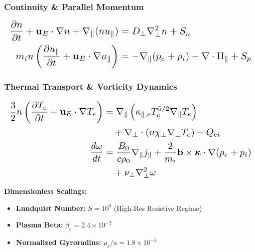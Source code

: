 \documentclass[landscape,a0,final]{a0poster}
\newlength{\colwidth}
\begin{document}
\begin{minipage}[t]{\colwidth}
\begin{tcolorbox}[posterbox, title={\faAtom\ 2. 5-Field Gyrofluid Transport Model}]
    \subsubsection*{Continuity \& Parallel Momentum}
    \[\resizebox{\linewidth}{!}{$\displaystyle
      \begin{aligned}
        \frac{\partial n}{\partial t} + \mathbf{u}_E \cdot \nabla n + \nabla_\parallel (n u_\parallel) &= D_\perp \nabla_\perp^2 n + S_n \\
        m_i n \left( \frac{\partial u_\parallel}{\partial t} + \mathbf{u}_E \cdot \nabla u_\parallel \right) &= -\nabla_\parallel (p_e + p_i) - \nabla \cdot \Pi_\parallel + S_p
      \end{aligned}
    $}\]

    \subsubsection*{Thermal Transport \& Vorticity Dynamics}
    \[\resizebox{\linewidth}{!}{$\displaystyle
      \begin{aligned}
        \frac{3}{2} n \left( \frac{\partial T_e}{\partial t} + \mathbf{u}_E \cdot \nabla T_e \right) &= \nabla_\parallel \left( \kappa_{\parallel,e} T_e^{5/2} \nabla_\parallel T_e \right) \\
        &\quad + \nabla_\perp \cdot (n \chi_\perp \nabla_\perp T_e) - Q_{ei} \\
        \frac{d \omega}{d t} &= \frac{B_0}{c \rho_0} \nabla_\parallel j_\parallel + \frac{2}{m_i} \mathbf{b} \times \boldsymbol{\kappa} \cdot \nabla (p_e + p_i) \\
        &\quad + \nu_\perp \nabla_\perp^2 \omega
      \end{aligned}
    $}\]

    \vspace{4pt}
    \textbf{Dimensionless Scalings:}
    \begin{itemize}[leftmargin=1.2em, itemsep=2pt]
      \item \textbf{Lundquist Number:} \(S = 10^8\) (High-Res Resistive Regime)
      \item \textbf{Plasma Beta:} \(\beta_e = 2.4 \times 10^{-2}\)
      \item \textbf{Normalized Gyroradius:} \(\rho_s / a = 1.8 \times 10^{-3}\)
    \end{itemize}
  \end{tcolorbox}

\end{minipage}%
\hfill%
\end{document}
